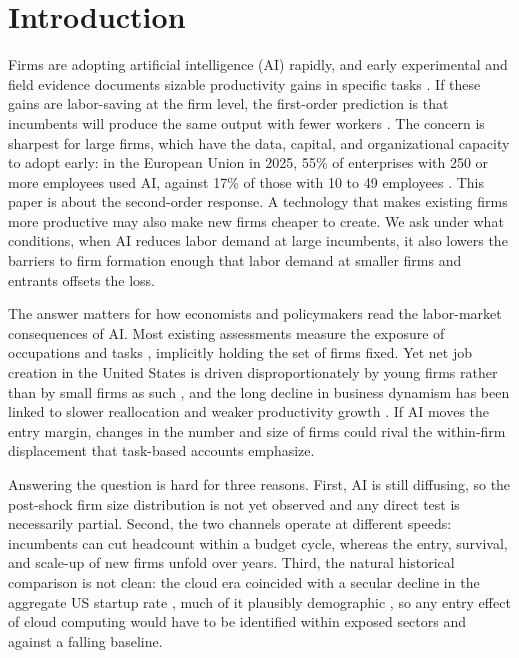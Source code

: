 \section{Introduction}\label{sec:intro}

Firms are adopting artificial intelligence (AI) rapidly, and early experimental and field evidence documents sizable productivity gains in specific tasks \citep{noy2023experimental,brynjolfsson2025generative}.
If these gains are labor-saving at the firm level, the first-order prediction is that incumbents will produce the same output with fewer workers \citep{acemoglu2019automation}.
The concern is sharpest for large firms, which have the data, capital, and organizational capacity to adopt early: in the European Union in 2025, 55\% of enterprises with 250 or more employees used AI, against 17\% of those with 10 to 49 employees \citep{eurostat2026isoc}.
This paper is about the second-order response.
A technology that makes existing firms more productive may also make new firms cheaper to create.
We ask under what conditions, when AI reduces labor demand at large incumbents, it also lowers the barriers to firm formation enough that labor demand at smaller firms and entrants offsets the loss.

The answer matters for how economists and policymakers read the labor-market consequences of AI.
Most existing assessments measure the exposure of occupations and tasks \citep{eloundou2024gpts,acemoglu2025simple}, implicitly holding the set of firms fixed.
Yet net job creation in the United States is driven disproportionately by young firms rather than by small firms as such \citep{haltiwanger2013who}, and the long decline in business dynamism has been linked to slower reallocation and weaker productivity growth \citep{decker2014role,decker2020changing}.
If AI moves the entry margin, changes in the number and size of firms could rival the within-firm displacement that task-based accounts emphasize.

Answering the question is hard for three reasons.
First, AI is still diffusing, so the post-shock firm size distribution is not yet observed and any direct test is necessarily partial.
Second, the two channels operate at different speeds: incumbents can cut headcount within a budget cycle, whereas the entry, survival, and scale-up of new firms unfold over years.
Third, the natural historical comparison is not clean: the cloud era coincided with a secular decline in the aggregate US startup rate \citep{decker2016declining,akcigit2021ten}, much of it plausibly demographic \citep{karahan2024demographic,hopenhayn2022population}, so any entry effect of cloud computing would have to be identified within exposed sectors and against a falling baseline.

